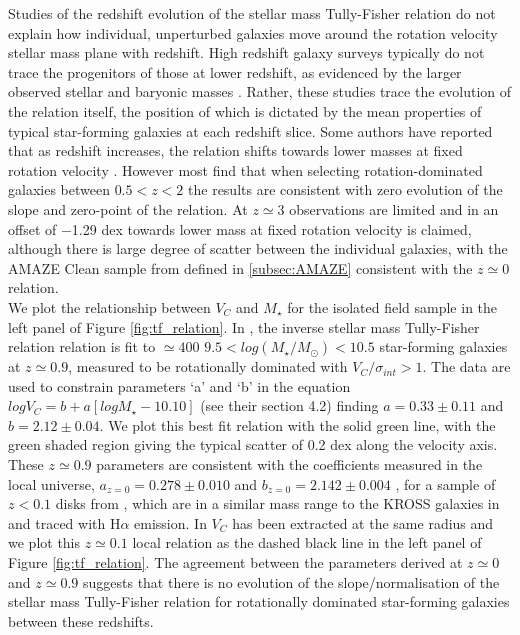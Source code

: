 \documentclass[fleqn,usenatbib]{mn2e}
\begin{document}
Studies of the redshift evolution of the stellar mass Tully-Fisher relation do not explain how individual, unperturbed galaxies move around the rotation velocity stellar mass plane with redshift. 
High redshift galaxy surveys typically do not trace the progenitors of those at lower redshift, as evidenced by the larger observed stellar and baryonic masses \citep[e.g.][]{Cresci2009,Reyes2011,Wisnioski2015,Ubler2017}.
Rather, these studies trace the evolution of the relation itself, the position of which is dictated by the mean properties of typical star-forming galaxies at each redshift slice.
Some authors have reported that as redshift increases, the relation shifts towards lower masses at fixed rotation velocity \citep[e.g.][]{Puech2008,Cresci2009,Puech2010,Straatman2017,Ubler2017}.
However most find that when selecting rotation-dominated galaxies between $0.5 < z < 2$ \citep[e.g.][]{Flores2006,Miller2011,Kassin2012,Miller2012,Vergani2012,Miller2014,Contini2015a,Molina2016,DiTeodoro2016,Simons2016,Pelliccia2017,Harrison2017} the results are consistent with zero evolution of the slope and zero-point of the relation.
At $z\simeq3$ observations are limited and in \cite{Gnerucci2011} an offset of $-$1.29 dex towards lower mass at fixed rotation velocity is claimed, although there is large degree of scatter between the individual galaxies, with the AMAZE Clean sample from \cite{Gnerucci2011} defined in \cref{subsec:AMAZE} consistent with the $z\simeq0$ relation. \\

We plot the relationship between $V_{C}$ and $M_{\star}$ for the isolated field sample in the left panel of Figure \ref{fig:tf_relation}.
In \cite{Harrison2017}, the inverse stellar mass Tully-Fisher relation relation is fit to $\simeq400$ $9.5 < log(M_{\star}/M_{\odot}) < 10.5$ star-forming galaxies at $z\simeq0.9$, measured to be rotationally dominated with $V_{C}/\sigma_{int} > 1$.
The data are used to constrain parameters `a' and `b' in the equation $logV_{C}=b+a[logM_{\star} - 10.10]$ (see their section 4.2) finding $a = 0.33 \pm 0.11$ and $b = 2.12 \pm 0.04$.
We plot this best fit relation with the solid green line, with the green shaded region giving the typical scatter of 0.2 dex along the velocity axis.
These $z\simeq0.9$ parameters are consistent with the coefficients measured in the local universe, $a_{z=0} = 0.278 \pm 0.010$ and $b_{z=0} = 2.142 \pm 0.004$ , for a sample of $z<0.1$ disks from \cite{Reyes2011}, which are in a similar mass range to the KROSS galaxies in \cite{Harrison2017} and traced with H$\alpha$ emission.
In \cite{Reyes2011} $V_{C}$ has been extracted at the same radius and we plot this $z\simeq0.1$ local relation as the dashed black line in the left panel of Figure \ref{fig:tf_relation}.
The agreement between the parameters derived at $z\simeq0$ and $z\simeq0.9$ suggests that there is no evolution of the slope/normalisation of the stellar mass Tully-Fisher relation for rotationally dominated star-forming galaxies between these redshifts. \\
\end{document}
